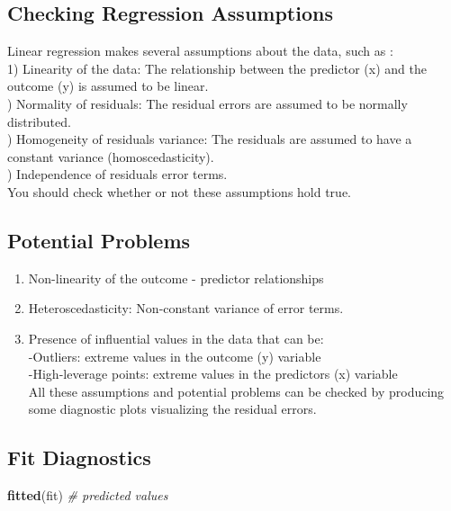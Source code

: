 \documentclass[]{article}
\newenvironment{Shaded}{\begin{snugshade}}{\end{snugshade}}
\newcommand{\KeywordTok}[1]{\textcolor[rgb]{0.13,0.29,0.53}{\textbf{#1}}}
\newcommand{\CommentTok}[1]{\textcolor[rgb]{0.56,0.35,0.01}{\textit{#1}}}
\newcommand{\NormalTok}[1]{#1}
\providecommand{\tightlist}{%
  \setlength{\itemsep}{0pt}\setlength{\parskip}{0pt}}
\begin{document}
\subsection{Checking Regression
Assumptions}\label{checking-regression-assumptions}

Linear regression makes several assumptions about the data, such as :
\pause \\
1) Linearity of the data: The relationship between the predictor (x) and
the outcome (y) is assumed to be linear.\\
) Normality of residuals: The residual errors are assumed to be
normally distributed.\\
) Homogeneity of residuals variance: The residuals are assumed to have
a constant variance (homoscedasticity).\\
) Independence of residuals error terms.\\
\pause
You should check whether or not these assumptions hold true.

\subsection{Potential Problems}\label{potential-problems}

\begin{enumerate}
\def\labelenumi{\arabic{enumi})}
\tightlist
\item
  Non-linearity of the outcome - predictor relationships \pause
\item
  Heteroscedasticity: Non-constant variance of error terms. \pause
\item
  Presence of influential values in the data that can be: \pause \\
  -Outliers: extreme values in the outcome (y) variable\\
  -High-leverage points: extreme values in the predictors (x) variable
  \pause \\
  All these assumptions and potential problems can be checked by
  producing some diagnostic plots visualizing the residual errors.
\end{enumerate}

\subsection{Fit Diagnostics}\label{fit-diagnostics}

\begin{Shaded}
\begin{Highlighting}[]
\KeywordTok{fitted}\NormalTok{(fit) }\CommentTok{# predicted values}
\end{Highlighting}
\end{Shaded}
\end{document}

